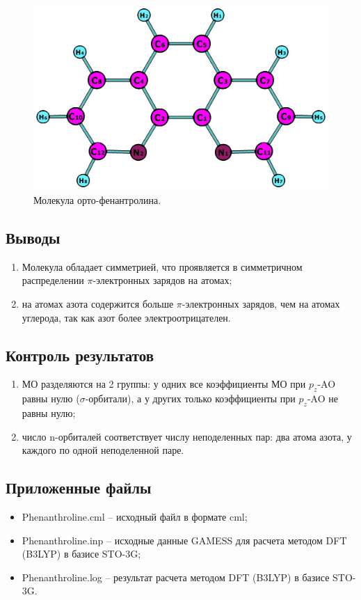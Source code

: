 \begin{figure}[H]
\centering
\captionsetup{justification=centering}
\includegraphics[scale=0.4]{fig/1.jpg}
\caption{Молекула орто-фенантролина.}
\label{img:img4}
\end{figure}


\subsection{Выводы}
\begin{enumerate}
    \item Молекула обладает симметрией, что проявляется в симметричном распределении $\pi$-электронных зарядов на атомах;
    \item на атомах азота содержится больше $\pi$-электронных зарядов, чем на атомах углерода, так как азот более электроотрицателен.
\end{enumerate}{}

\subsection{Контроль результатов}
\begin{enumerate}
    \item МО разделяются на 2 группы: у одних все коэффициенты МО при $p_z$-AO равны нулю ($\sigma$-орбитали), а у других только коэффициенты при $p_z$-AO не равны нулю;
    \item число n-орбиталей соответствует числу неподеленных пар: два атома азота, у каждого по одной неподеленной паре.
\end{enumerate}

\subsection{Приложенные файлы}
\begin{itemize}
    \item Phenanthroline.cml – исходный файл в формате cml;
    \item Phenanthroline.inp – исходные данные GAMESS для расчета методом DFT (B3LYP) в базисе STO-3G;
    \item Phenanthroline.log – результат расчета методом DFT (B3LYP)  в базисе STO-3G.
\end{itemize}{}